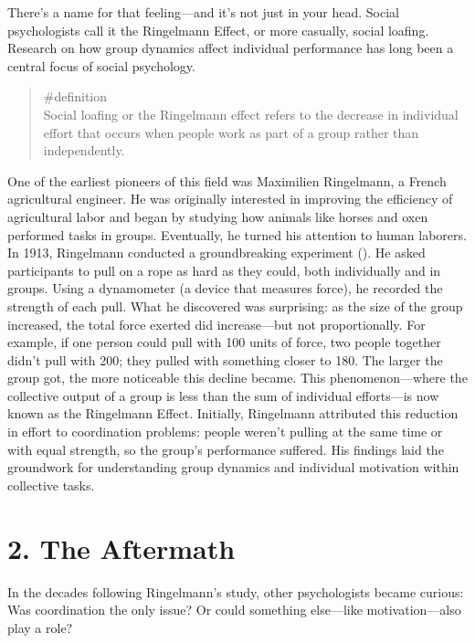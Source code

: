 \documentclass[
  letterpaper,
]{book}
\begin{document}
There's a name for that feeling---and it's not just in your head. Social
psychologists call it the Ringelmann Effect, or more casually, social
loafing. Research on how group dynamics affect individual performance
has long been a central focus of social psychology.

\begin{quote}
\label{def-socialloafing}{\#definition}\\
Social loafing or the Ringelmann effect refers to the decrease in
individual effort that occurs when people work as part of a group rather
than independently.
\end{quote}

One of the earliest pioneers of this field was Maximilien Ringelmann, a
French agricultural engineer. He was originally interested in improving
the efficiency of agricultural labor and began by studying how animals
like horses and oxen performed tasks in groups. Eventually, he turned
his attention to human laborers. In 1913, Ringelmann conducted a
groundbreaking experiment
(). He asked
participants to pull on a rope as hard as they could, both individually
and in groups. Using a dynamometer (a device that measures force), he
recorded the strength of each pull. What he discovered was surprising:
as the size of the group increased, the total force exerted did
increase---but not proportionally. For example, if one person could pull
with 100 units of force, two people together didn't pull with 200; they
pulled with something closer to 180. The larger the group got, the more
noticeable this decline became. This phenomenon---where the collective
output of a group is less than the sum of individual efforts---is now
known as the Ringelmann Effect. Initially, Ringelmann attributed this
reduction in effort to coordination problems: people weren't pulling at
the same time or with equal strength, so the group's performance
suffered. His findings laid the groundwork for understanding group
dynamics and individual motivation within collective tasks.

\section{2. The Aftermath}\label{the-aftermath-8}

In the decades following Ringelmann's study, other psychologists became
curious: Was coordination the only issue? Or could something else---like
motivation---also play a role?
\end{document}
